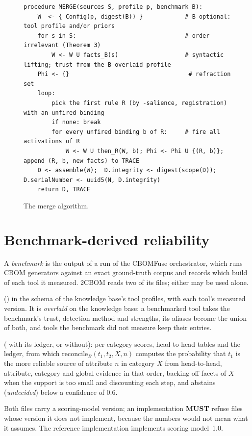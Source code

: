 \documentclass[11pt,a4paper]{article}
\newcommand{\twocbom}{2CBOM}
\newcommand{\MUST}{\textbf{MUST}}
\theoremstyle{definition}
\theoremstyle{plain}
\begin{document}
\begin{figure}[ht]
\begin{lstlisting}
procedure MERGE(sources S, profile p, benchmark B):
    W  <- { Config(p, digest(B)) }            # B optional: tool profile and/or priors
    for s in S:                               # order irrelevant (Theorem 3)
        W <- W U facts_B(s)                   # syntactic lifting; trust from the B-overlaid profile
    Phi <- {}                                  # refraction set
    loop:
        pick the first rule R (by -salience, registration) with an unfired binding
        if none: break
        for every unfired binding b of R:     # fire all activations of R
            W <- W U then_R(W, b); Phi <- Phi U {(R, b)}; append (R, b, new facts) to TRACE
    D <- assemble(W);  D.integrity <- digest(scope(D));  D.serialNumber <- uuid5(N, D.integrity)
    return D, TRACE
\end{lstlisting}
\caption{The merge algorithm.}
\end{figure}

\section{Benchmark-derived reliability}\label{sec:benchmark}
A \emph{benchmark} is the output of a run of the CBOMFuse orchestrator, which runs CBOM generators
against an exact ground-truth corpus and records which build of each tool it measured. \twocbom{}
reads two of its files; either may be used alone.
\begin{description}[nosep]
\item[Tool profile] () in the schema of the knowledge base's tool profiles,
  with each tool's measured version. It is \emph{overlaid} on the knowledge base: a benchmarked tool
  takes the benchmark's trust, detection method and strengths, its aliases become the union of both,
  and tools the benchmark did not measure keep their entries.
\item[Reliability priors] ( with its ledger, or  without):
  per-category scores, head-to-head tables and the ledger, from which
  $\mathrm{reconcile}_B(t_1, t_2, X, n)$ computes the probability that $t_1$ is the more reliable
  source of attribute $n$ in category $X$ from head-to-head, attribute, category and global
  evidence in that order, backing off facets of $X$ when the support is too small and discounting
  each step, and abstains (\emph{undecided}) below a confidence of $0.6$.
\end{description}
Both files carry a scoring-model version; an implementation \MUST{} refuse files whose version it
does not implement, because the numbers would not mean what it assumes. The reference
implementation implements scoring model~1.0.
\end{document}
